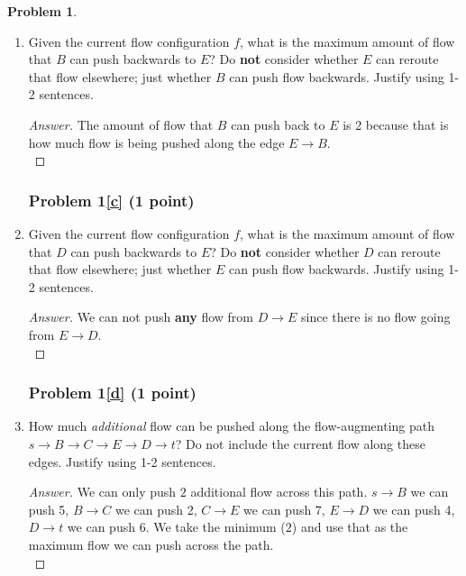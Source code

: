 \documentclass[11pt]{article}
\theoremstyle{definition}
\theoremstyle{definition}
\newtheorem{required}{Problem}
\theoremstyle{definition}
\begin{document}
\begin{required}
\begin{enumerate}[label=(\alph*)]
\vskip 10pt
\subsubsection{Problem 1\ref{b} (0.5 points)}
\item \label{b} Given the current flow configuration $f$, what is the maximum amount of flow that $B$ can push backwards to $E$? Do \textbf{not} consider whether $E$ can reroute that flow elsewhere; just whether $B$ can push flow backwards. Justify using 1-2 sentences.

\begin{proof}[Answer]
The amount of flow that $B$ can push back to $E$ is 2 because that is how much flow is being pushed along the edge $E \to B$.\\
\end{proof}



\vskip 10pt
\subsubsection{Problem 1\ref{c} (1 point)}
\item \label{c} Given the current flow configuration $f$, what is the maximum amount of flow that $D$ can push backwards to $E$? Do \textbf{not} consider whether $D$ can reroute that flow elsewhere; just whether $E$ can push flow backwards. Justify using 1-2 sentences.

\begin{proof}[Answer]
We can not push \textbf{any} flow from $D \to E$ since there is no flow going from $E \to D$.\\
\end{proof}


\vskip 10pt
\subsubsection{Problem 1\ref{d} (1 point)}
\item \label{d} How much \textit{additional} flow can be pushed along the flow-augmenting path $s \to B \to C \to E \to D \to t$? Do not include the current flow along these edges. Justify using 1-2 sentences.

\begin{proof}[Answer]
We can only push $2$ additional flow across this path. $s \to B$ we can push 5, $B \to C$ we can push 2, $C \to E$ we can push 7, $E \to D$ we can push 4, $D \to t$ we can push 6. We take the minimum ($2$) and use that as the maximum flow we can push across the path.\\
\end{proof}



\end{enumerate}
\end{required}
\end{document}
